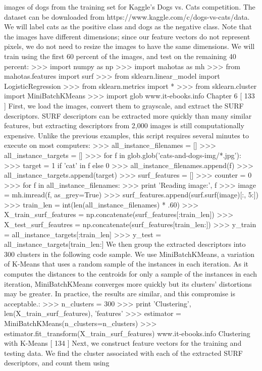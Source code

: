 images of dogs from the training set for Kaggle's Dogs vs. Cats competition. The dataset
can be downloaded from https://www.kaggle.com/c/dogs-vs-cats/data. We
will label cats as the positive class and dogs as the negative class. Note that the images
have different dimensions; since our feature vectors do not represent pixels, we do not
need to resize the images to have the same dimensions. We will train using the first 60
percent of the images, and test on the remaining 40 percent:
>>> import numpy as np
>>> import mahotas as mh
>>> from mahotas.features import surf
>>> from sklearn.linear_model import LogisticRegression
>>> from sklearn.metrics import *
>>> from sklearn.cluster import MiniBatchKMeans
>>> import glob
www.it-ebooks.info
Chapter 6
[ 133 ]
First, we load the images, convert them to grayscale, and extract the SURF
descriptors. SURF descriptors can be extracted more quickly than many similar
features, but extracting descriptors from 2,000 images is still computationally
expensive. Unlike the previous examples, this script requires several minutes
to execute on most computers:
>>> all_instance_filenames = []
>>> all_instance_targets = []
>>> for f in glob.glob('cats-and-dogs-img/*.jpg'):
>>> target = 1 if 'cat' in f else 0
>>> all_instance_filenames.append(f)
>>> all_instance_targets.append(target)
>>> surf_features = []
>>> counter = 0
>>> for f in all_instance_filenames:
>>> print 'Reading image:', f
>>> image = mh.imread(f, as_grey=True)
>>> surf_features.append(surf.surf(image)[:, 5:])
>>> train_len = int(len(all_instance_filenames) * .60)
>>> X_train_surf_features = np.concatenate(surf_features[:train_len])
>>> X_test_surf_feautres = np.concatenate(surf_features[train_len:])
>>> y_train = all_instance_targets[:train_len]
>>> y_test = all_instance_targets[train_len:]
We then group the extracted descriptors into 300 clusters in the following code
sample. We use MiniBatchKMeans, a variation of K-Means that uses a random
sample of the instances in each iteration. As it computes the distances to the
centroids for only a sample of the instances in each iteration, MiniBatchKMeans
converges more quickly but its clusters' distortions may be greater. In practice,
the results are similar, and this compromise is acceptable.:
>>> n_clusters = 300
>>> print 'Clustering', len(X_train_surf_features), 'features'
>>> estimator = MiniBatchKMeans(n_clusters=n_clusters)
>>> estimator.fit_transform(X_train_surf_features)
www.it-ebooks.info
Clustering with K-Means
[ 134 ]
Next, we construct feature vectors for the training and testing data. We find the
cluster associated with each of the extracted SURF descriptors, and count them using
